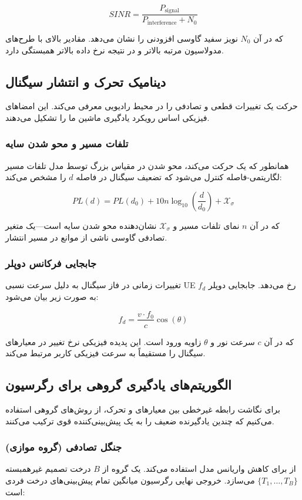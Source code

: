 \documentclass{CSICC}
\begin{document}
\[
SINR=\frac{P_{\text{signal}}}{P_{\text{interference}}+N_{0}}
\]

که در آن \(N_{0}\) نویز سفید گاوسی افزودنی را نشان می‌دهد. مقادیر بالای  با طرح‌های مدولاسیون مرتبه بالاتر و در نتیجه نرخ داده بالاتر همبستگی دارد.

\subsection{دینامیک تحرک و انتشار سیگنال}
حرکت یک  تغییرات قطعی و تصادفی را در محیط رادیویی معرفی می‌کند. این امضاهای فیزیکی اساس رویکرد یادگیری ماشین ما را تشکیل می‌دهند.

\subsubsection{تلفات مسیر و محو شدن سایه}
همانطور که یک  حرکت می‌کند، محو شدن در مقیاس بزرگ توسط مدل تلفات مسیر لگاریتمی-فاصله کنترل می‌شود که تضعیف سیگنال در فاصله \(d\) را مشخص می‌کند:

\[
PL(d)=PL(d_{0})+10n\log_{10}\left(\frac{d}{d_{0}}\right)+\mathcal{X}_{\sigma}
\]

که در آن \(n\) نمای تلفات مسیر و \(\mathcal{X}_{\sigma}\) نشان‌دهنده محو شدن سایه است—یک متغیر تصادفی گاوسی  ناشی از موانع در مسیر انتشار.
\subsubsection{جابجایی فرکانس دوپلر}
تغییرات زمانی در فاز سیگنال به دلیل سرعت نسبی UE رخ می‌دهد. جابجایی دوپلر \(f_d\) به صورت زیر بیان می‌شود:

\[
f_d=\frac{v\cdot f_{0}}{c}\cos(\theta)
\]

که در آن \(c\) سرعت نور و \(\theta\) زاویه ورود است. این پدیده فیزیکی نرخ تغییر در معیارهای سیگنال را مستقیماً به سرعت فیزیکی کاربر مرتبط می‌کند.



\subsection{الگوریتم‌های یادگیری گروهی برای رگرسیون}
برای نگاشت رابطه غیرخطی بین معیارهای  و تحرک، از روش‌های گروهی استفاده می‌کنیم که چندین یادگیرنده ضعیف را به یک پیش‌بینی‌کننده قوی ترکیب می‌کنند.

\subsubsection{جنگل تصادفی (گروه موازی)}
 از  برای کاهش واریانس مدل استفاده می‌کند. یک گروه از \(B\) درخت تصمیم غیرهمبسته \(\{T_{1},\ldots,T_{B}\}\) می‌سازد. خروجی نهایی رگرسیون میانگین تمام پیش‌بینی‌های درخت فردی است:
\end{document}

